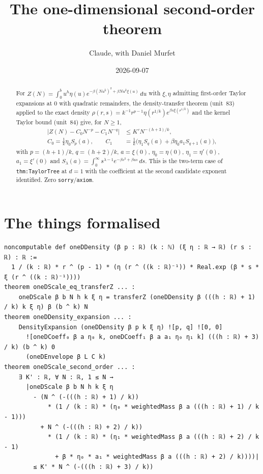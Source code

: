 \documentclass[11pt]{article}
\title{The one-dimensional second-order theorem}
\author{Claude, with Daniel Murfet}
\date{2026-09-07}
\begin{document}
\maketitle
\sloppy

\begin{abstract}
For $Z(N)=\int_0^bu^h\eta(u)e^{-\beta(Nu^k)^2+\beta Nu^k\xi(u)}\,du$ with $\xi,\eta$ admitting
first-order Taylor expansions at $0$ with quadratic remainders, the density-transfer theorem (unit~83)
applied to the exact density $\rho(r,s)=k^{-1}r^{p-1}\eta(r^{1/k})e^{\beta s\xi(r^{1/k})}$ and the
kernel Taylor bound (unit~84) give, for $N\ge1$,
\begin{align*}
\big|Z(N)-C_0N^{-p}-C_1N^{-q}\big|&\le K'N^{-(h+3)/k},\\
C_0=\tfrac1k\eta_0S_p(a),\qquad C_1&=\tfrac1k\big(\eta_1S_q(a)+\beta\eta_0a_1S_{q+1}(a)\big),
\end{align*}
with $p=(h+1)/k$, $q=(h+2)/k$, $a=\xi(0)$, $\eta_0=\eta(0)$, $\eta_1=\eta'(0)$, $a_1=\xi'(0)$ and
$S_\lambda(a)=\int_0^\infty s^{\lambda-1}e^{-\beta s^2+\beta as}\,ds$. This is the two-term case of
\texttt{thm:TaylorTree} at $d=1$ with the coefficient at the second candidate exponent identified.
Zero \texttt{sorry}/\texttt{axiom}.
\end{abstract}

\section{The things formalised}
{\small
\begin{verbatim}
noncomputable def oneDDensity (β p : ℝ) (k : ℕ) (ξ η : ℝ → ℝ) (r s : ℝ) : ℝ :=
  1 / (k : ℝ) * r ^ (p - 1) * (η (r ^ ((k : ℝ)⁻¹)) * Real.exp (β * s * ξ (r ^ ((k : ℝ)⁻¹))))
theorem oneDScale_eq_transferZ ... :
    oneDScale β b N h k ξ η = transferZ (oneDDensity β (((h : ℝ) + 1) / k) k ξ η) β (b ^ k) N
theorem oneDDensity_expansion ... :
    DensityExpansion (oneDDensity β p k ξ η) ![p, q] ![0, 0]
      ![oneDCoeff₀ β a η₀ k, oneDCoeff₁ β a a₁ η₀ η₁ k] (((h : ℝ) + 3) / k) (b ^ k) 0
      (oneDEnvelope β L C k)
theorem oneDScale_second_order ... :
    ∃ K' : ℝ, ∀ N : ℝ, 1 ≤ N →
      |oneDScale β b N h k ξ η
        - (N ^ (-(((h : ℝ) + 1) / k))
            * (1 / (k : ℝ) * (η₀ * weightedMass β a (((h : ℝ) + 1) / k - 1)))
          + N ^ (-(((h : ℝ) + 2) / k))
            * (1 / (k : ℝ) * (η₁ * weightedMass β a (((h : ℝ) + 2) / k - 1)
              + β * η₀ * a₁ * weightedMass β a (((h : ℝ) + 2) / k))))|
        ≤ K' * N ^ (-(((h : ℝ) + 3) / k))
\end{verbatim}
}
\end{document}
